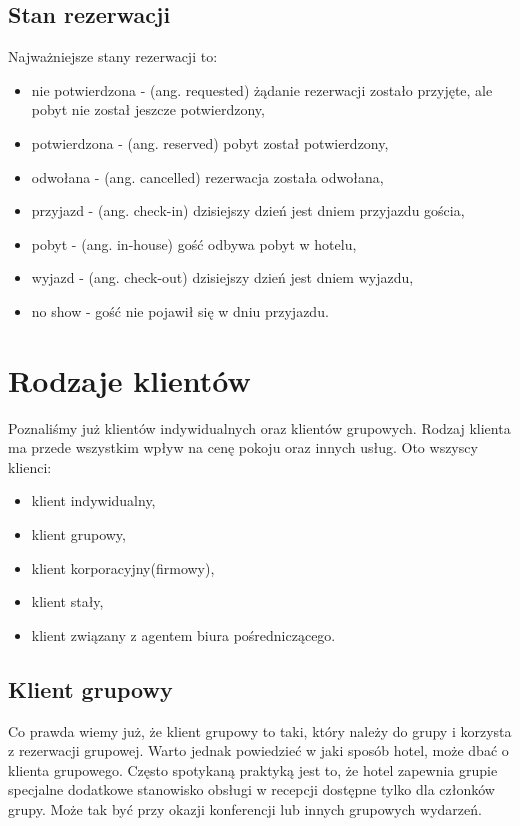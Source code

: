 \documentclass[a4paper,onecolumn,oneside,11pt,wide,floatssmall]{mwrep}
\theoremstyle{definition}
\theoremstyle{plain}%
\theoremstyle{remark}
\begin{document}
\subsection{Stan rezerwacji}
\label{chap1:stany-rezerwacji}
Najważniejsze stany rezerwacji to:
\begin{itemize}
  \item nie potwierdzona - (ang. requested) żądanie rezerwacji zostało 
  przyjęte, ale pobyt nie został jeszcze potwierdzony,
  \item potwierdzona - (ang. reserved) pobyt został potwierdzony,
  \item odwołana - (ang. cancelled) rezerwacja została odwołana,
  \item przyjazd - (ang. check-in) dzisiejszy dzień jest dniem przyjazdu 
  gościa,
  \item pobyt - (ang. in-house) gość odbywa pobyt w hotelu,
  \item wyjazd - (ang. check-out) dzisiejszy dzień jest dniem wyjazdu,
  \item no show - gość nie pojawił się w dniu przyjazdu.
\end{itemize}

\section{Rodzaje klientów}
\label{rodzaje-klientow}
Poznaliśmy już klientów indywidualnych oraz klientów grupowych. Rodzaj 
klienta ma przede wszystkim wpływ na cenę pokoju oraz innych usług. Oto 
wszyscy klienci:

\begin{itemize}
  \item klient indywidualny,
  \item klient grupowy,
  \item klient korporacyjny(firmowy),
  \item klient stały,
  \item klient związany z agentem biura pośredniczącego.
\end{itemize}

\subsection{Klient grupowy}
Co prawda wiemy już, że klient grupowy to taki, który należy do grupy i 
korzysta z rezerwacji grupowej. Warto jednak powiedzieć w jaki sposób hotel, 
może dbać o klienta grupowego. Często spotykaną praktyką jest to, że hotel 
zapewnia grupie specjalne dodatkowe stanowisko obsługi w recepcji dostępne 
tylko dla członków grupy. Może tak być przy okazji konferencji lub innych 
grupowych wydarzeń.
\end{document}
